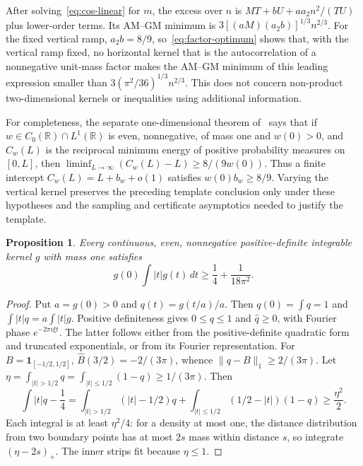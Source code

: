 \documentclass[10pt]{article}
\numberwithin{equation}{section}
\newtheorem{proposition}[theorem]{Proposition}
\theoremstyle{remark}
\newcommand{\R}{\mathbb R}
\newcommand{\ind}{\mathbf1}
\begin{document}
After solving~\eqref{eq:cos-linear} for $m$, the excess over $n$ is
$MT+bU+aa_2n^2/(TU)$ plus lower-order terms. Its AM--GM minimum is
$3[(aM)(a_2b)]^{1/3}n^{2/3}$. For the fixed vertical ramp,
$a_2b=8/9$, so~\eqref{eq:factor-optimum} shows that, with the vertical
ramp fixed, no horizontal kernel that is the autocorrelation of a
nonnegative unit-mass factor makes the AM--GM minimum of this leading
expression smaller than $3(\pi^2/36)^{1/3}n^{2/3}$.
This does not concern non-product two-dimensional
kernels or inequalities using additional information.

For completeness, the separate one-dimensional theorem of~\cite{Chen26}
says that if $w\in C_0(\R)\cap L^1(\R)$ is even, nonnegative, of
mass one and $w(0)>0$, and $C_w(L)$ is the reciprocal minimum energy
of positive probability measures on $[0,L]$, then
$\liminf_{L\to\infty}(C_w(L)-L)\ge8/(9w(0))$.
Thus a finite intercept $C_w(L)=L+b_w+o(1)$ satisfies
$w(0)b_w\ge8/9$. Varying the vertical kernel preserves the preceding
template conclusion only under these hypotheses and the sampling
and certificate asymptotics needed to justify the template.

\begin{proposition}\label{prop:full-lower}
Every continuous, even, nonnegative positive-definite integrable
kernel $g$ with mass one satisfies
\begin{equation}\label{eq:full-lower}
 g(0)\int|t|g(t)\,dt\ge\frac14+\frac1{18\pi^2}.
\end{equation}
\end{proposition}
\begin{proof}
Put $a=g(0)>0$ and $q(t)=g(t/a)/a$. Then $q(0)=\int q=1$ and
$\int|t|q=a\int|t|g$. Positive definiteness gives $0\le q\le1$
and $\widehat q\ge0$, with Fourier phase $e^{-2\pi i\xi t}$.
The latter follows either from the positive-definite quadratic form
and truncated exponentials, or from its Fourier representation.
For $B=\ind_{[-1/2,1/2]}$, $\widehat B(3/2)=-2/(3\pi)$, whence
$\|q-B\|_1\ge2/(3\pi)$. Let
$\eta=\int_{|t|>1/2}q=\int_{|t|\le1/2}(1-q)\ge1/(3\pi)$.
Then
\[
 \int|t|q-\frac14
 =\int_{|t|>1/2}(|t|-1/2)q
    +\int_{|t|\le1/2}(1/2-|t|)(1-q)
 \ge\frac{\eta^2}{2}.
\]
Each integral is at least $\eta^2/4$: for a density at most one,
the distance distribution from two boundary points has at most
$2s$ mass within distance $s$, so integrate $(\eta-2s)_+$.
The inner strips fit because $\eta\le1$.
\end{proof}
\end{document}

